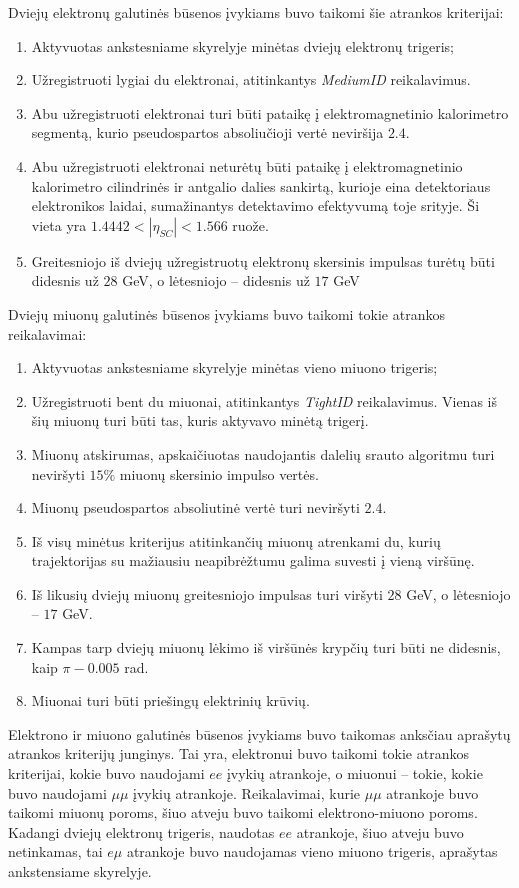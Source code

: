 \documentclass[a4paper, 12pt]{article}
\newcommand{\emu}{e\mu}
\newcommand{\mumu}{\mu\mu}
\begin{document}
Dviejų elektronų galutinės būsenos įvykiams buvo taikomi šie atrankos kriterijai:
\begin{enumerate}
	\item Aktyvuotas ankstesniame skyrelyje minėtas dviejų elektronų trigeris;
	\item Užregistruoti lygiai du elektronai, atitinkantys \textit{MediumID} reikalavimus.
	\item Abu užregistruoti elektronai turi būti pataikę į elektromagnetinio kalorimetro segmentą, kurio
	pseudospartos absoliučioji vertė neviršija $2.4$.
	\item Abu užregistruoti elektronai neturėtų būti pataikę į elektromagnetinio kalorimetro cilindrinės ir
	antgalio dalies sankirtą, kurioje eina detektoriaus elektronikos laidai, sumažinantys detektavimo efektyvumą
	toje srityje. Ši vieta yra $1.4442<|\eta_{SC}|<1.566$ ruože.
	\item Greitesniojo iš dviejų užregistruotų elektronų skersinis impulsas turėtų būti didesnis už $28$ GeV, o
	lėtesniojo -- didesnis už $17$ GeV
\end{enumerate}

Dviejų miuonų galutinės būsenos įvykiams buvo taikomi tokie atrankos reikalavimai:
\begin{enumerate}
	\item Aktyvuotas ankstesniame skyrelyje minėtas vieno miuono trigeris;
	\item Užregistruoti bent du miuonai, atitinkantys \textit{TightID} reikalavimus. Vienas iš šių miuonų turi būti
	tas, kuris aktyvavo	minėtą trigerį.
	\item Miuonų atskirumas, apskaičiuotas naudojantis dalelių srauto algoritmu turi neviršyti $15\%$ miuonų skersinio
	impulso vertės.
	\item Miuonų pseudospartos absoliutinė vertė turi neviršyti $2.4$.
	\item Iš visų minėtus kriterijus atitinkančių miuonų atrenkami du, kurių trajektorijas su mažiausiu neapibrėžtumu
	galima suvesti į vieną viršūnę.
	\item Iš likusių dviejų miuonų greitesniojo impulsas turi viršyti $28$ GeV, o lėtesniojo -- $17$ GeV.
	\item Kampas tarp dviejų miuonų lėkimo iš viršūnės krypčių turi būti ne didesnis, kaip $\pi - 0.005$ rad.
	\item Miuonai turi būti priešingų elektrinių krūvių.
\end{enumerate}

Elektrono ir miuono galutinės būsenos įvykiams buvo taikomas anksčiau aprašytų atrankos kriterijų junginys.
Tai yra, elektronui buvo taikomi tokie atrankos kriterijai, kokie buvo naudojami $ee$ įvykių atrankoje, o miuonui --
tokie, kokie buvo naudojami $\mumu$ įvykių atrankoje. Reikalavimai, kurie $\mumu$ atrankoje buvo taikomi miuonų poroms,
šiuo atveju buvo taikomi elektrono-miuono poroms.
Kadangi dviejų elektronų trigeris, naudotas $ee$ atrankoje, šiuo atveju buvo netinkamas, tai $\emu$ atrankoje buvo naudojamas
vieno miuono trigeris, aprašytas ankstensiame skyrelyje.
\end{document}
